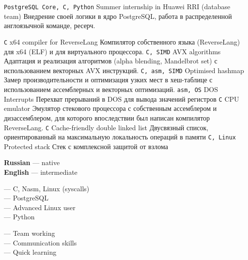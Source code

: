 \documentclass[9pt]{developercv} %
\begin{document}
	
	\begin{entrylist}
		\entry
		{\texttt{PostgreSQL Core, C, Python}}
		{Summer internship in Huawei RRI (database team)}
		{}
		{Внедрение своей логики в ядро PostgreSQL, работа в распределенной англоязычной команде, ресерч.}
		
		\entry
		{\texttt{C}}
		{x64 compiler for ReverseLang}
		{}
		{Компилятор собственного языка (ReverseLang) для x64 (ELF) и для виртуального процессора.}
		\entry
		{\texttt{C, SIMD}}
		{AVX algorithms}
		{}
		{Адаптация и реализация алгоритмов (alpha blending, Mandelbrot set) с использованием векторных AVX инструкций.}
		\entry
		{\texttt{C, asm, SIMD}}
		{Optimised hashmap}
		{}
		{Замер производительности и оптимизация узких мест в хеш-таблице с использованием ассемблерных и векторных оптимизаций.}
		\entry
		{\texttt{asm, OS}}
		{DOS Interrupts}
		{}
		{Перехват прерываний в DOS для вывода значений регистров}
		\entry
		{\texttt{C}}
		{CPU emulator}
		{}
		{Эмулятор стекового процессора с собственным ассемблером и дизассемблером, для которого впоследствии был написан компилятор ReverseLang.}
		\entry
		{\texttt{C}}
		{Cache-friendly double linked list}
		{}
		{Двусвязный список, ориентированный на максимальную локальность операций в памяти}
		\entry
		{\texttt{C, Linux}}
		{Protected stack}
		{}
		{Стек с комплексной защитой от взлома}
	\end{entrylist}
	
	
	\begin{minipage}[t]{0.3\textwidth}
		\vspace{-\baselineskip} %
		
		
		\textbf{Russian} — native\\
		\textbf{English} — intermediate\\
	\end{minipage}
	\hfill
	\begin{minipage}[t]{0.3\textwidth}
		\vspace{-\baselineskip} %
		
		— C, Nasm, Linux (syscalls)\\
		— PostgreSQL \\
		— Advanced Linux user\\
		— Python
	\end{minipage}
	\hfill
	\begin{minipage}[t]{0.3\textwidth}
		\vspace{-\baselineskip} %
		
		— Team working\\
		— Communication skills\\
		— Quick learning
	\end{minipage}
	
\end{document}
